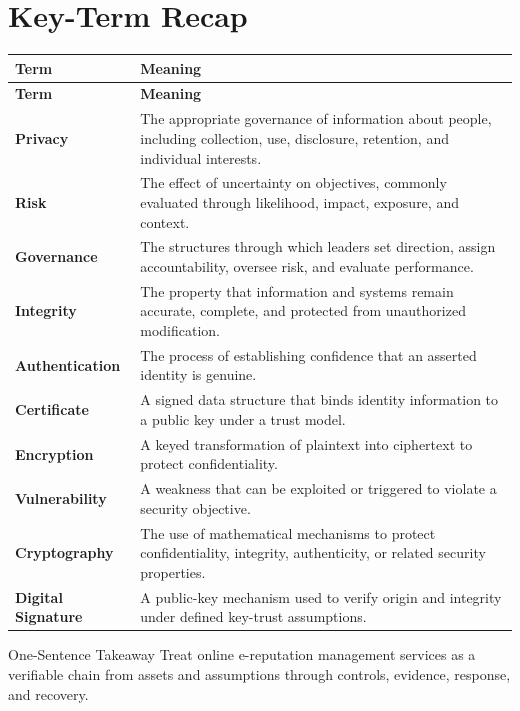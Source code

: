 \documentclass[11pt,letterpaper]{article}
\begin{document}
\section*{Key-Term Recap}
\begin{longtable}{>{\raggedright\arraybackslash}p{}>{\raggedright\arraybackslash}p{}}
\toprule\rowcolor{Navy}\color{white}\textbf{Term} & \color{white}\textbf{Meaning}\\\midrule
\endfirsthead
\toprule\rowcolor{Navy}\color{white}\textbf{Term} & \color{white}\textbf{Meaning}\\\midrule
\endhead
\textbf{Privacy} & The appropriate governance of information about people, including collection, use, disclosure, retention, and individual interests. \\\midrule
\textbf{Risk} & The effect of uncertainty on objectives, commonly evaluated through likelihood, impact, exposure, and context. \\\midrule
\textbf{Governance} & The structures through which leaders set direction, assign accountability, oversee risk, and evaluate performance. \\\midrule
\textbf{Integrity} & The property that information and systems remain accurate, complete, and protected from unauthorized modification. \\\midrule
\textbf{Authentication} & The process of establishing confidence that an asserted identity is genuine. \\\midrule
\textbf{Certificate} & A signed data structure that binds identity information to a public key under a trust model. \\\midrule
\textbf{Encryption} & A keyed transformation of plaintext into ciphertext to protect confidentiality. \\\midrule
\textbf{Vulnerability} & A weakness that can be exploited or triggered to violate a security objective. \\\midrule
\textbf{Cryptography} & The use of mathematical mechanisms to protect confidentiality, integrity, authenticity, or related security properties. \\\midrule
\textbf{Digital Signature} & A public-key mechanism used to verify origin and integrity under defined key-trust assumptions. \\\midrule
\bottomrule
\end{longtable}
\begin{CornellExamBox}{One-Sentence Takeaway}
Treat online e-reputation management services as a verifiable chain from assets and assumptions through controls, evidence, response, and recovery.
\end{CornellExamBox}
\end{document}

